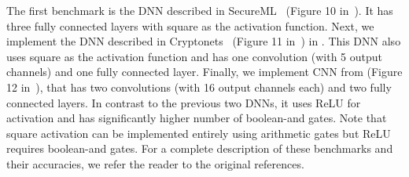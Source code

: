 The first benchmark  is the DNN described in
SecureML~\cite{secureml} (Figure 10 in~\cite{minionn}).
It has three fully connected layers with square as the activation function.
Next, we implement the DNN described in Cryptonets~\cite{cryptonets} (Figure 11 in~\cite{minionn})
in \tool.
This DNN also uses square as the activation function and has one
convolution (with 5 output channels) and one fully connected layer. 
Finally, we implement CNN from \minion (Figure 12 in~\cite{minionn}), that has
two convolutions (with 16 output channels each) and two fully
connected layers.  In contrast to the previous two DNNs, it uses
ReLU for activation and
has significantly higher number of boolean-and gates.
Note that square activation can be implemented entirely using
arithmetic gates but ReLU requires boolean-and gates.  For a complete
description of these benchmarks and their accuracies, we refer the
reader to the original references. 



%

